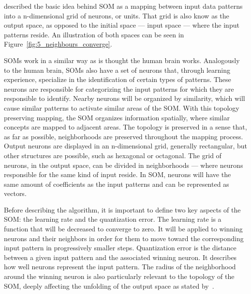 \documentclass[journal]{IEEEtran}
\begin{document}
\citet{Bacao2005} described the basic idea behind \ac{SOM} as a mapping between input data patterns into a n-dimensional grid of neurons, or units. That grid is also know as the output space, as opposed to the initial space --- input space --- where the input patterns reside. An illustration of both spaces can be seen in Figure~\ref{fig:5_neighbours_converge}.

SOMs work in a similar way as is thought the human brain works. Analogously to the human brain, SOMs also have a set of neurons that, through learning experience, specialize in the identification of certain types of patterns. These neurons are responsible for categorizing the input patterns for which they are responsible to identify. Nearby neurons will be organized by similarity, which will cause similar patterns to activate similar areas of the \ac{SOM}.
With this topology preserving mapping, the \ac{SOM} organizes information spatially, where similar concepts are mapped to adjacent areas. The topology is preserved in a sense that, as far as possible, neighborhoods are preserved throughout the mapping process.
Output neurons are displayed in an n-dimensional grid, generally rectangular, but other structures are possible, such as hexagonal or octagonal.  The grid of neurons, in the output space, can be divided in neighborhoods --- where neurons responsible for the same kind of input reside.
In \ac{SOM}, neurons will have the same amount of coefficients as the input patterns and can be represented as vectors.

Before describing the algorithm, it is important to define two key aspects of the \ac{SOM}: the learning rate and the quantization error. The learning rate is a function that will be decreased to converge to zero. It will be applied to winning neurons and their neighbors in order for them to move toward the corresponding input pattern in progressively smaller steps. Quantization error is the distance between a given input pattern and the associated winning neuron. It describes how well neurons represent the input pattern. The radius of the neighborhood around the winning neuron is also particularly relevant to the topology of the \ac{SOM}, deeply affecting the unfolding of the output space as stated by~\citet{Bacao2005}. 


\end{document}

